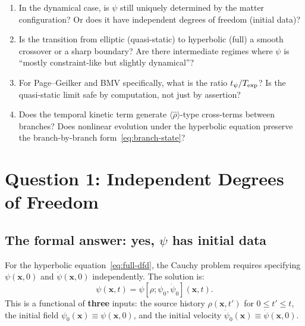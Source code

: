 \documentclass[12pt,a4paper]{article}
\begin{document}
\begin{enumerate}
\item[\textbf{Q1.}] In the dynamical case, is $\psi$ still uniquely
determined by the matter configuration? Or does it have independent
degrees of freedom (initial data)?

\item[\textbf{Q2.}] Is the transition from elliptic (quasi-static) to
hyperbolic (full) a smooth crossover or a sharp boundary? Are there
intermediate regimes where $\psi$ is ``mostly constraint-like but
slightly dynamical''?

\item[\textbf{Q3.}] For Page--Geilker and BMV specifically, what is
the ratio $t_\psi / T_{\rm exp}$? Is the quasi-static limit safe by
computation, not just by assertion?

\item[\textbf{Q4.}] Does the temporal kinetic term generate
$\langle\hat\rho\rangle$-type cross-terms between branches? Does
nonlinear evolution under the hyperbolic equation preserve the
branch-by-branch form~\eqref{eq:branch-state}?
\end{enumerate}


\section{Question 1: Independent Degrees of Freedom}
\label{sec:Q1}

\subsection{The formal answer: yes, $\psi$ has initial data}

For the hyperbolic equation~\eqref{eq:full-dfd}, the Cauchy problem
requires specifying $\psi(\mathbf{x},0)$ and $\dot\psi(\mathbf{x},0)$
independently. The solution is:
\begin{equation}\label{eq:retarded}
\psi(\mathbf{x},t) = \psi[\rho; \psi_0, \dot\psi_0](\mathbf{x},t).
\end{equation}
This is a functional of \textbf{three} inputs: the source history
$\rho(\mathbf{x},t')$ for $0 \leq t' \leq t$, the initial field
$\psi_0(\mathbf{x}) \equiv \psi(\mathbf{x},0)$, and the initial
velocity $\dot\psi_0(\mathbf{x}) \equiv \dot\psi(\mathbf{x},0)$.
\end{document}
